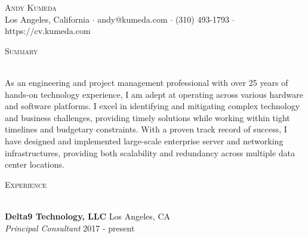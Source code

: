\documentclass[a4paper]{article}
\newcommand{\lineunder} {
    \vspace*{-8pt} \\
    \hspace*{-18pt} \hrulefill \\
}
\newcommand{\header} [1] {
    {\hspace*{-18pt}\vspace*{6pt} \textsc{#1}}
    \vspace*{-6pt} \lineunder
}
\begin{document}
\vspace*{-15pt}

\vspace*{-10pt}
\begin{center}
	{\Huge \scshape {Andy Kumeda}}\\
	Los Angeles, California $\cdot$ andy@kumeda.com $\cdot$ (310) 493-1793 $\cdot$ https://cv.kumeda.com\\
\end{center}

\header{Summary}
\vspace{1mm}

As an engineering and project management professional with over 25 years of hands-on technology experience, I am adept at operating across various hardware and software platforms. I excel in identifying and mitigating complex technology and business challenges, providing timely solutions while working within tight timelines and budgetary constraints. With a proven track record of success, I have designed and implemented large-scale enterprise server and networking infrastructures, providing both scalability and redundancy across multiple data center locations.

\vspace{1mm}

\header{Experience}
\vspace{1mm}

\textbf{Delta9 Technology, LLC} \hfill Los Angeles, CA\\
\textit{Principal Consultant} \hfill 2017 - present\\
\vspace{-1mm}
\end{document}
